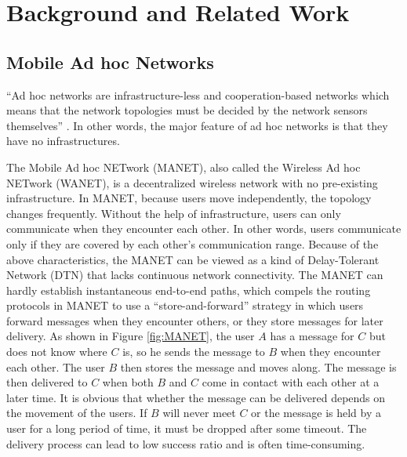 \chapter {Background and Related Work}
\label{BRW}
\section{Mobile Ad hoc Networks}
\noindent ``Ad hoc networks are infrastructure-less and cooperation-based networks which means that the network topologies must be decided by the network sensors themselves'' \cite {C14}. In other words, the major feature of ad hoc networks is that they have no infrastructures.

The Mobile Ad hoc NETwork (MANET), also called the Wireless Ad hoc NETwork (WANET), is a decentralized wireless network with no pre-existing infrastructure. In MANET, because users move independently, the topology changes frequently. Without the help of infrastructure, users can only communicate when they encounter each other. In other words, users communicate only if they are covered by each other's communication range. Because of the above characteristics, the MANET can be viewed as a kind of Delay-Tolerant Network (DTN) that lacks continuous network connectivity. The MANET can hardly establish instantaneous end-to-end paths, which compels the routing protocols in MANET to use a ``store-and-forward'' strategy in which users forward messages when they encounter others, or they store messages for later delivery. As shown in Figure \ref{fig:MANET}, the user $A$ has a message for $C$ but does not know where $C$ is, so he sends the message to $B$ when they encounter each other. The user $B$ then stores the message and moves along. The message is then delivered to $C$ when both $B$ and $C$ come in contact with each other at a later time. It is obvious that whether the message can be delivered depends on the movement of the users. If $B$ will never meet $C$ or the message is held by a user for a long period of time, it must be dropped after some timeout. The delivery process can lead to low success ratio and is often time-consuming.

